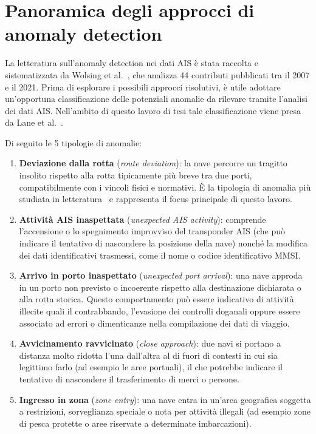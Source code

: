 \section{Panoramica degli approcci di anomaly detection}
\label{sec:panoramica}

La letteratura sull'anomaly detection nei dati AIS è stata raccolta e 
sistematizzata da Wolsing et al.~\cite{riassuntone}, che analizza 44 contributi pubblicati 
tra il 2007 e il 2021.
Prima di esplorare i possibili approcci risolutivi, è utile adottare un'opportuna
classificazione delle potenziali anomalie da rilevare tramite l'analisi dei dati AIS.
Nell'ambito di questo lavoro di tesi tale classificazione viene presa da Lane et al.~\cite{lane2010}.

Di seguito le 5 tipologie di anomalie:

\begin{enumerate}
    \item \textbf{Deviazione dalla rotta} (\textit{route deviation}):
        la nave percorre un tragitto insolito rispetto alla rotta tipicamente
        più breve tra due porti, compatibilmente con i vincoli fisici e normativi.
        È la tipologia di anomalia più studiata in letteratura~\cite{riassuntone} e rappresenta
        il focus principale di questo lavoro.
 
    \item \textbf{Attività AIS inaspettata} (\textit{unexpected AIS activity}):
        comprende l'accensione o lo spegnimento improvviso del
        transponder AIS  (che può indicare il tentativo di nascondere
        la posizione della nave) nonché la modifica dei dati
        identificativi trasmessi, come il nome o codice identificativo MMSI.

    \item \textbf{Arrivo in porto inaspettato} (\textit{unexpected port arrival}):
        una nave approda in un porto non previsto o incoerente rispetto
        alla destinazione dichiarata o alla rotta storica. Questo
        comportamento può essere indicativo di attività illecite quali il
        contrabbando, l'evasione dei controlli doganali oppure essere associato
        ad errori o dimenticanze nella compilazione dei dati di viaggio.
 
    \item \textbf{Avvicinamento ravvicinato} (\textit{close approach}):
        due navi si portano a distanza molto ridotta l'una dall'altra al di fuori
        di contesti in cui sia legittimo farlo (ad esempio le aree portuali), 
        il che potrebbe indicare il tentativo di nascondere il trasferimento
        di merci o persone.

    \item \textbf{Ingresso in zona} (\textit{zone entry}):
        una nave entra in un'area geografica soggetta a restrizioni,
        sorveglianza speciale o nota per attività illegali (ad esempio
        zone di pesca protette o aree riservate a determinate imbarcazioni).
\end{enumerate}

